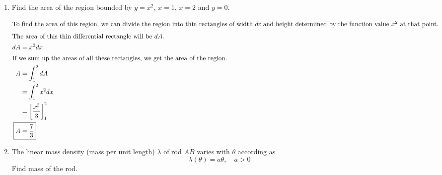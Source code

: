 \begin{enumerate}
    \item Find the area of the region bounded by $y=x^2$, $x=1$, $x=2$ and $y=0$.
        \begin{solution}
            \begin{center}
            \end{center}
            \begin{align*}
                \intertext{To find the area of this region, we can divide the region into thin rectangles of width $d\!x$ and height determined by the function value $x^2$ at that point.}
                \intertext{The area of this thin differential rectangle will be $dA$.}
                dA &= x^2 dx\\
                \intertext{If we sum up the areas of all these rectangles, we get the area of the region.}
                A &= \int_1^2 dA\\
                &= \int_1^2 x^2 dx\\
                &= \left[\frac{x^3}{3}\right]_1^2\\
                \Aboxed{A &= \frac{7}{3}}
            \end{align*}
        \end{solution}
\BgThispage
        \item The linear mass density (mass per unit length) $\lambda$ of rod $AB$ varies with $\theta$ according as \[ \lambda(\theta) = a\theta, \quad a>0 \]Find mass of the rod.
        \begin{center}
\end{center}
\end{enumerate}
